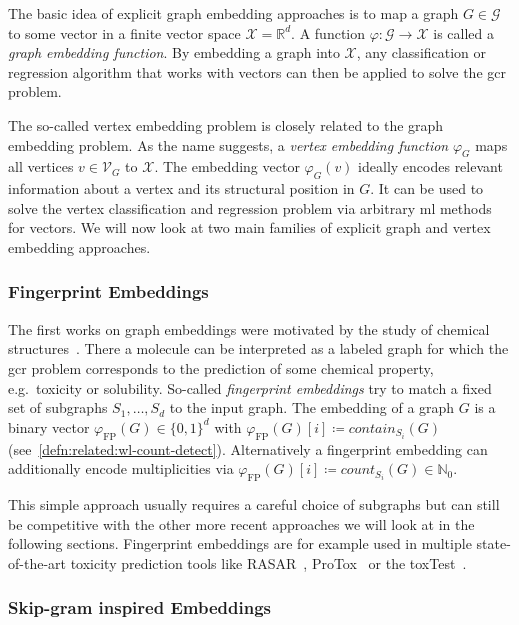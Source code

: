 The basic idea of explicit graph embedding approaches is to map a graph $G \in \mathcal{G}$ to some vector in a finite vector space $\mathcal{X} = \mathbb{R}^d$.
A function $\varphi: \mathcal{G} \to \mathcal{X}$ is called a \textit{graph embedding function}.
By embedding a graph into $\mathcal{X}$, any classification or regression algorithm that works with vectors can then be applied to solve the \ac{gcr} problem.

The so-called vertex embedding problem is closely related to the graph embedding problem.
As the name suggests, a \textit{vertex embedding function} $\varphi_G$ maps all vertices $v \in \mathcal{V}_G$ to $\mathcal{X}$.
The embedding vector $\varphi_G(v)$ ideally encodes relevant information about a vertex and its structural position in $G$.
It can be used to solve the vertex classification and regression problem via arbitrary \ac{ml} methods for vectors.
We will now look at two main families of explicit graph and vertex embedding approaches.

\subsubsection{Fingerprint Embeddings}

The first works on graph embeddings were motivated by the study of chemical structures~\cite{Adamson1973}\cite{Willett1986}.
There a molecule can be interpreted as a labeled graph for which the \ac{gcr} problem corresponds to the prediction of some chemical property, e.g.\ toxicity or solubility.
So-called \textit{fingerprint embeddings} try to match a fixed set of subgraphs $S_1, \dots, S_d$ to the input graph.
The embedding of a graph $G$ is a binary vector ${\varphi}_{\text{FP}}(G) \in {\{0, 1\}}^d$ with ${\varphi}_{\text{FP}}(G)[i] \coloneqq \mathit{contain}_{S_i}(G)$ (see~\cref{defn:related:wl-count-detect}).
Alternatively a fingerprint embedding can additionally encode multiplicities via ${\varphi}_{\text{FP}}(G)[i] \coloneqq \mathit{count}_{S_i}(G) \in \mathbb{N}_0$.

This simple approach usually requires a careful choice of subgraphs but can still be competitive with the other more recent approaches we will look at in the following sections.
Fingerprint embeddings are for example used in multiple state-of-the-art toxicity prediction tools like RASAR~\cite{Luechtefeld2018}\cite{ToxTrack}, ProTox~\cite{Drwal2014}\cite{ProTox}\cite{Banerjee2018} or the \ac{toxTest}~\cite{TEST}.

\subsubsection{Skip-gram inspired Embeddings}

